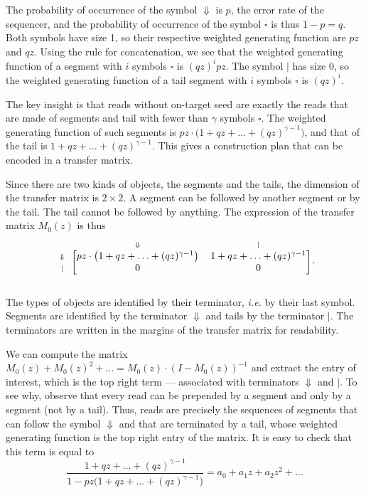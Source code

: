 \documentclass{article}
\begin{document}
The probability of occurrence of the symbol $\Downarrow$ is $p$, the error
rate of the sequencer, and the probability of occurrence of the symbol
$\square$ is thus $1-p = q$. Both symbols have size 1, so their respective
weighted generating function are $pz$ and $qz$. Using the rule for
concatenation, we see that the weighted generating function of a segment
with $i$ symbols $\square$ is $(qz)^ipz$. The symbol $|$ has size 0, so
the weighted generating function of a tail segment with $i$ symbols
$\square$ is $(qz)^i$.

The key insight is that reads without on-target seed are exactly the reads
that are made of segments and tail with fewer than $\gamma$ symbols
$\square$. The weighted generating function of such segments is $pz \cdot
\big( 1+qz+\ldots+(qz)^{\gamma-1} \big)$, and that of the tail is
$1+qz+\ldots+(qz)^{\gamma-1}$. This gives a construction plan that can be
encoded in a transfer matrix.

Since there are two kinds of objects, the segments and the tails, the
dimension of the transfer matrix is $2 \times 2$. A segment can be
followed by another segment or by the tail. The tail cannot be followed by
anything. The expression of the transfer matrix $M_0(z)$ is thus
\begin{equation*}
\begin{blockarray}{ccc}
   & \scriptstyle{\Downarrow} & \scriptstyle{|} \\
\begin{block}{c[cc]}
\scriptstyle{\Downarrow} & pz \cdot \big( 1+qz+\ldots+(qz)^{\gamma-1}
\big)  & 1+qz+\ldots+(qz)^{\gamma-1} \\
\scriptstyle{|} & 0 & 0 \\
\end{block}
\end{blockarray}.
\end{equation*}

The types of objects are identified by their terminator, \textit{i.e.} by
their last symbol. Segments are identified by the terminator $\Downarrow$
and tails by the terminator $|$. The terminators are written in the
margins of the transfer matrix for readability.

We can compute the matrix $M_0(z) + M_0(z)^2 + \ldots = M_0(z) \cdot
(I-M_0(z))^{-1}$ and extract the entry of interest, which is the top right
term --- associated with terminators $\Downarrow$ and $|$. To see why,
observe that every read can be prepended by a segment and only by a
segment (not by a tail). Thus, reads are precisely the sequences of
segments that can follow the symbol $\Downarrow$ and that are terminated
by a tail, whose weighted generating function is the top right entry of
the matrix. It is easy to check that this term is equal to
\begin{equation}
\label{eq:F}
\frac{1+qz+\ldots+(qz)^{\gamma-1}}
  {1-pz \big(1+qz+\ldots+(qz)^{\gamma-1} \big)} = a_0 + a_1z + a_2z^2 +
\ldots
\end{equation}
\end{document}
